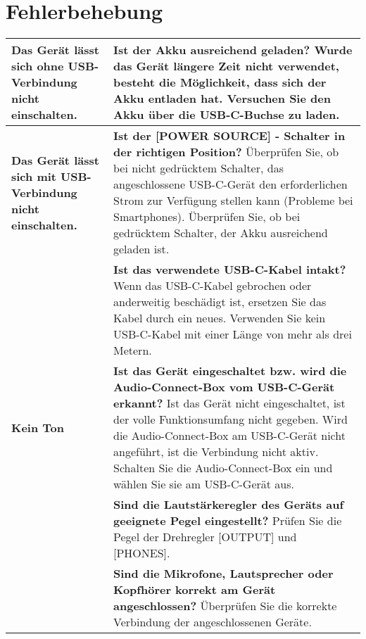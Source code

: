 \pagebreak

\section{Fehlerbehebung}
\begin{table}[H]
    \centering
    \begin{tabularx}{\textwidth}{|L{4cm}|X|}
        \hline
         \textbf{Das Gerät lässt sich ohne USB-Verbindung nicht einschalten.} & \textbf{Ist der Akku ausreichend geladen?} \newline
            Wurde das Gerät längere Zeit nicht verwendet, besteht die Möglichkeit, dass sich der Akku entladen hat.
            Versuchen Sie den Akku über die USB-C-Buchse zu laden. \\
        \hline
         \textbf{Das Gerät lässt sich mit USB-Verbindung nicht einschalten.} & \textbf{Ist der [POWER SOURCE] - Schalter in der richtigen Position?} \newline
            Überprüfen Sie, ob bei nicht gedrücktem Schalter, das angeschlossene USB-C-Gerät den erforderlichen Strom zur Verfügung stellen kann (Probleme bei Smartphones).
            Überprüfen Sie, ob bei gedrücktem Schalter, der Akku ausreichend geladen ist. \\
          & \textbf{Ist das verwendete USB-C-Kabel intakt?} \newline 
            Wenn das USB-C-Kabel gebrochen oder anderweitig beschädigt ist, ersetzen Sie das Kabel durch ein neues. Verwenden Sie kein USB-C-Kabel mit einer Länge von mehr als drei Metern. \\
        \hline
         \textbf{Kein Ton} & \textbf{Ist das Gerät eingeschaltet bzw. wird die Audio-Connect-Box vom USB-C-Gerät erkannt?} \newline
            Ist das Gerät nicht eingeschaltet, ist der volle Funktionsumfang nicht gegeben.
            Wird die Audio-Connect-Box am USB-C-Gerät nicht angeführt, ist die Verbindung nicht aktiv.
            Schalten Sie die Audio-Connect-Box ein und wählen Sie sie am USB-C-Gerät aus.\\
          & \textbf{Sind die Lautstärkeregler des Geräts auf geeignete Pegel eingestellt?} \newline
            Prüfen Sie die Pegel der Drehregler [OUTPUT] und [PHONES]. \\
          & \textbf{Sind die Mikrofone, Lautsprecher oder Kopfhörer korrekt am Gerät angeschlossen?} \newline
            Überprüfen Sie die korrekte Verbindung der angeschlossenen Geräte. \\
        \hline
    \end{tabularx}%
\end{table}%
  
